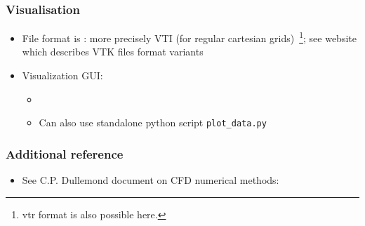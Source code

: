 \begin{frame}
\frametitle{Visualisation}

\begin{itemize}
\item File format is : more precisely VTI (for regular cartesian grids)~\footnote{vtr format is also possible here.}; see website  which describes VTK files format variants
\item Visualization GUI: 
  \begin{itemize}
  \item {}
  \item Can also use standalone python script \texttt{plot\_data.py}
  \end{itemize}
\end{itemize}

\end{frame}

\begin{frame}
  \frametitle{Additional reference}
  
  \begin{itemize}
  \item See C.P. Dullemond document on CFD numerical methods: {\small {}}
  \end{itemize}

\end{frame}
